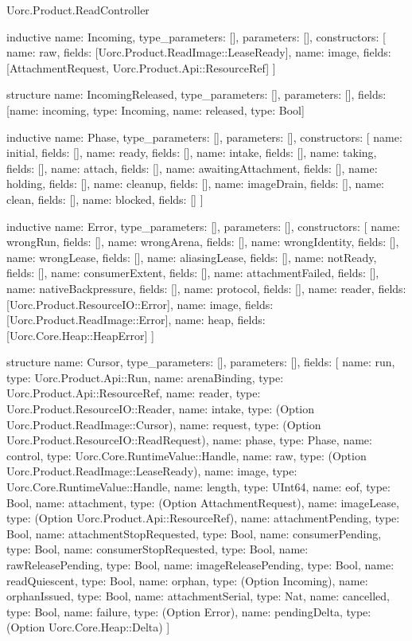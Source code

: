 \begin{lexlean}{Uorc.Product.ReadController}
\begin{semanticmodule}
inductive{
  name: Incoming,
  type_parameters: [],
  parameters: [],
  constructors: [
    {name: raw, fields: [Uorc.Product.ReadImage::LeaseReady]},
    {name: image, fields: [AttachmentRequest, Uorc.Product.Api::ResourceRef]}
  ]
}

structure{
  name: IncomingReleased,
  type_parameters: [],
  parameters: [],
  fields: [{name: incoming, type: Incoming}, {name: released, type: Bool}]
}

inductive{
  name: Phase,
  type_parameters: [],
  parameters: [],
  constructors: [
    {name: initial, fields: []},
    {name: ready, fields: []},
    {name: intake, fields: []},
    {name: taking, fields: []},
    {name: attach, fields: []},
    {name: awaitingAttachment, fields: []},
    {name: holding, fields: []},
    {name: cleanup, fields: []},
    {name: imageDrain, fields: []},
    {name: clean, fields: []},
    {name: blocked, fields: []}
  ]
}

inductive{
  name: Error,
  type_parameters: [],
  parameters: [],
  constructors: [
    {name: wrongRun, fields: []},
    {name: wrongArena, fields: []},
    {name: wrongIdentity, fields: []},
    {name: wrongLease, fields: []},
    {name: aliasingLease, fields: []},
    {name: notReady, fields: []},
    {name: consumerExtent, fields: []},
    {name: attachmentFailed, fields: []},
    {name: nativeBackpressure, fields: []},
    {name: protocol, fields: []},
    {name: reader, fields: [Uorc.Product.ResourceIO::Error]},
    {name: image, fields: [Uorc.Product.ReadImage::Error]},
    {name: heap, fields: [Uorc.Core.Heap::HeapError]}
  ]
}

structure{
  name: Cursor,
  type_parameters: [],
  parameters: [],
  fields: [
    {name: run, type: Uorc.Product.Api::Run},
    {name: arenaBinding, type: Uorc.Product.Api::ResourceRef},
    {name: reader, type: Uorc.Product.ResourceIO::Reader},
    {name: intake, type: (Option Uorc.Product.ReadImage::Cursor)},
    {name: request, type: (Option Uorc.Product.ResourceIO::ReadRequest)},
    {name: phase, type: Phase},
    {name: control, type: Uorc.Core.RuntimeValue::Handle},
    {name: raw, type: (Option Uorc.Product.ReadImage::LeaseReady)},
    {name: image, type: Uorc.Core.RuntimeValue::Handle},
    {name: length, type: UInt64},
    {name: eof, type: Bool},
    {name: attachment, type: (Option AttachmentRequest)},
    {name: imageLease, type: (Option Uorc.Product.Api::ResourceRef)},
    {name: attachmentPending, type: Bool},
    {name: attachmentStopRequested, type: Bool},
    {name: consumerPending, type: Bool},
    {name: consumerStopRequested, type: Bool},
    {name: rawReleasePending, type: Bool},
    {name: imageReleasePending, type: Bool},
    {name: readQuiescent, type: Bool},
    {name: orphan, type: (Option Incoming)},
    {name: orphanIssued, type: Bool},
    {name: attachmentSerial, type: Nat},
    {name: cancelled, type: Bool},
    {name: failure, type: (Option Error)},
    {name: pendingDelta, type: (Option Uorc.Core.Heap::Delta)}
  ]
}


\end{semanticmodule}
\end{lexlean}
